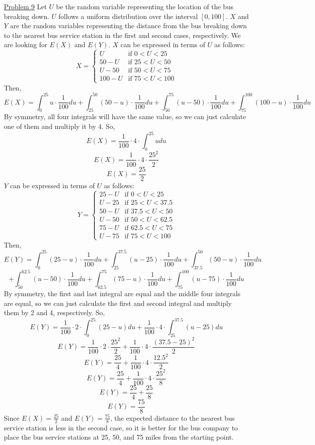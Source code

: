 \documentclass{exam}
\begin{document}
\underline{Problem 9}
\newline
\newline
Let $U$ be the random variable representing the location of the bus breaking down. $U$ follows a uniform distribution over the interval $[0,100]$. $X$ and $Y$ are the random variables representing the distance from the bus breaking down to the nearest bus service station in the first and second cases, respectively. We are looking for $E(X)$ and $E(Y)$. $X$ can be expressed in terms of $U$ as follows:
\[X = \begin{cases}
U & \text{if } 0<U<25 \\
50-U & \text{if } 25<U<50 \\
U-50 & \text{if } 50<U<75 \\
100-U & \text{if } 75<U<100
\end{cases}\]
Then,
\[E(X) = \int_{0}^{25}u\cdot\frac{1}{100}du+\int_{25}^{50}(50-u)\cdot\frac{1}{100}du+\int_{50}^{75}(u-50)\cdot\frac{1}{100}du+\int_{75}^{100}(100-u)\cdot\frac{1}{100}du\]
By symmetry, all four integrals will have the same value, so we can just calculate one of them and multiply it by 4. So,
\[E(X) = \frac{1}{100}\cdot4\cdot\int_{0}^{25}udu\]
\[E(X) = \frac{1}{100}\cdot4\cdot\frac{25^2}{2}\]
\[E(X) = \frac{25}{2}\]
$Y$ can be expressed in terms of $U$ as follows:
\[Y = \begin{cases}
25-U & \text{if } 0<U<25 \\
U-25 & \text{if } 25<U<37.5 \\
50-U & \text{if } 37.5<U<50 \\
U-50 & \text{if } 50<U<62.5 \\
75-U & \text{if } 62.5<U<75 \\
U-75 & \text{if } 75<U<100
\end{cases}\]
Then,
\[E(Y) = \int_{0}^{25}(25-u)\cdot\frac{1}{100}du+\int_{25}^{37.5}(u-25)\cdot\frac{1}{100}du+\int_{37.5}^{50}(50-u)\cdot\frac{1}{100}du\]
\[+\int_{50}^{62.5}(u-50)\cdot\frac{1}{100}du+\int_{62.5}^{75}(75-u)\cdot\frac{1}{100}du+\int_{75}^{100}(u-75)\cdot\frac{1}{100}du\]
By symmetry, the first and last integral are equal and the middle four integrals are equal, so we can just calculate the first and second integral and multiply them by 2 and 4, respectively. So,
\[E(Y) = \frac{1}{100}\cdot2\cdot\int_{0}^{25}(25-u)du+\frac{1}{100}\cdot4\cdot\int_{25}^{37.5}(u-25)du\]
\[E(Y) = \frac{1}{100}\cdot2\cdot\frac{25^2}{2}+\frac{1}{100}\cdot4\cdot\frac{(37.5-25)^2}{2}\]
\[E(Y) = \frac{25}{4}+\frac{1}{100}\cdot4\cdot\frac{12.5^2}{2}\]
\[E(Y) = \frac{25}{4}+\frac{1}{100}\cdot4\cdot\frac{25^2}{8}\]
\[E(Y) = \frac{25}{4}+\frac{25}{8}\]
\[E(Y) = \frac{75}{8}\]
Since $E(X)=\frac{25}{2}$ and $E(Y)=\frac{75}{8}$, the expected distance to the nearest bus service station is less in the second case, so it is better for the bus company to place the bus service stations at 25, 50, and 75 miles from the starting point.
\newline
\end{document}
